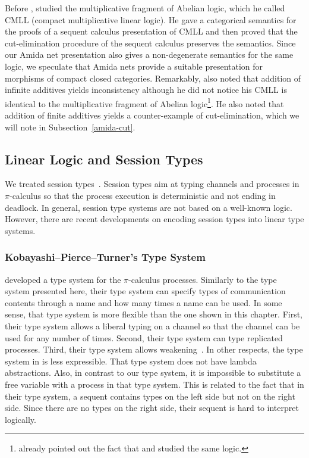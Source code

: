 Before \citet{metcalfe2002},
\citet{shirahata} studied the multiplicative fragment of Abelian logic,
which he called CMLL (compact multiplicative linear logic).
He gave a categorical semantics for the proofs of a sequent calculus
presentation of CMLL and then proved
that the cut-elimination procedure of
the sequent calculus preserves the semantics.
Since our Amida net presentation also gives a non-degenerate semantics
for the same logic, we speculate that Amida nets provide a suitable
presentation for morphisms of compact closed categories.
Remarkably,
\citet{shirahata} also noted that addition of infinite additives yields
inconsistency
although he did not notice his CMLL is identical to the multiplicative
fragment of Abelian logic\footnote{
\citet{expanding} already pointed out
the fact that \citet{shirahata} and
\citet{metcalfe2002} studied the same logic.}.
He also noted that addition of finite additives yields a counter-example
of cut-elimination, which we will note in Subsection~\ref{amida-cut}.

\subsection{Linear Logic and Session Types}

We treated session types~\citep{interaction,honda-session}.
Session types aim at typing channels and processes in $\pi$-calculus so
that the process execution is deterministic and not ending in deadlock.
In general, session type systems are not based on a well-known logic.
However, there are recent developments on encoding session types into
linear type systems.

\subsubsection{Kobayashi--Pierce--Turner's Type System}

\citet{kobayashi-pierce-turner} developed a type system for the
$\pi$-calculus processes.
Similarly to the type system presented here,
their type system can specify
types of communication contents through a name and
how many times a name can be used.
In some sense,
that type system is more flexible than the one shown in this chapter.
First, their type system allows a liberal typing on a channel so
that the channel can be used for any number of times.
Second, their type system can type replicated processes.
Third, their type system allows
weakening~\citep[Lemma~3.2]{kobayashi-pierce-turner}.
In other respects,
the type system in \citep{kobayashi-pierce-turner} is less expressible.
That type system does not have lambda abstractions.
Also, in contrast to our type system,
it is impossible to substitute a free variable with a process in that
type system.
This is related to the fact that in their type system,
a sequent contains types on the left side but not on the right side.
Since there are no types on the right side, their sequent is hard to
interpret logically.

